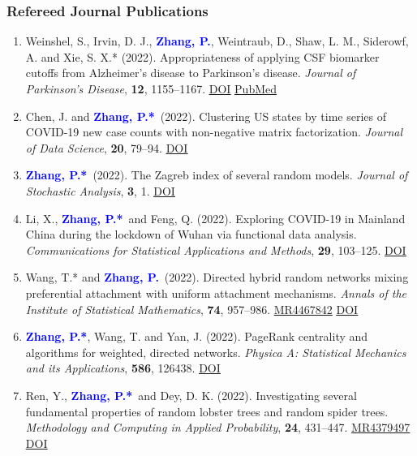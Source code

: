 \documentclass{res}
\def\MR#1{\href{http://www.ams.org/mathscinet-getitem?mr=#1}{MR#1}}
\newcommand{\PZ}{\textbf{\textcolor{blue}{Zhang, P.*}}}
\newcommand{\PZnot}{\textbf{\textcolor{blue}{Zhang, P.}}}
\begin{document}
\begin{resume}
\subsubsection{Refereed Journal Publications}
\begin{enumerate}
	\item {\sc Weinshel, S., Irvin, D. J.,} \PZnot, {\sc Weintraub, 
	D., Shaw, L. M., Siderowf, A. and Xie, S. X.*} (2022). 
	Appropriateness of applying CSF biomarker cutoffs from 
	Alzheimer’s disease to Parkinson’s disease. {\em Journal of 
	Parkinson's Disease}, {\bf 12}, 1155--1167. 
	\href{https://doi.org/10.3233/JPD-212989}{\underline{DOI}} 
	\href{https://pubmed.ncbi.nlm.nih.gov/35431261}
	{\underline{PubMed}}
	
	\item {\sc Chen, J.} and \PZ\ (2022). Clustering US states by 
	time series of COVID-19 new case counts with non-negative matrix 
	factorization. {\em Journal of Data Science}, {\bf 20}, 79--94.
	\href{https://doi.org/10.6339/22-JDS1036}{\underline{DOI}}
	
	\item \PZ\ (2022). The Zagreb index of several random models. 
	{\em Journal of Stochastic Analysis}, {\bf 3}, 1. 
	\href{https://doi.org/10.31390/josa.3.1.01}{\underline{DOI}}
	
	\item {\sc Li, X.}, \PZ\ and {\sc Feng, Q.} (2022). Exploring 
	COVID-19 in Mainland China during the lockdown of Wuhan via 
	functional data analysis. {\em Communications for Statistical 
	Applications and Methods}, {\bf 29}, 103--125. 
	\href{https://doi.org/10.29220/CSAM.2022.29.1.103}
	{\underline{DOI}}
	
	\item {\sc Wang, T.*} and \PZnot\ (2022). Directed 
	hybrid random networks mixing preferential attachment with 
	uniform attachment mechanisms. {\em Annals of the Institute of 
	Statistical Mathematics}, {\bf 74}, 957--986. \MR{4467842}
	\href{https://doi.org/10.1007/s10463-022-00827-5}
	{\underline{DOI}}
	
	\item \PZ, {\sc Wang, T.} and {\sc Yan, J.} (2022). PageRank 
	centrality and algorithms for weighted, directed networks. {\em 
	Physica A: Statistical Mechanics and its Applications}, {\bf 
	586}, 126438. 
	\href{https://doi.org/10.1016/j.physa.2021.126438}
	{\underline{DOI}}
	
	\item {\sc Ren, Y.}, \PZ\ and {\sc Dey, D. K.} (2022). 
	Investigating several fundamental properties of random 
	lobster trees and random spider trees. {\em Methodology and 
		Computing in Applied Probability}, {\bf 24}, 431--447. 
	\MR{4379497} \href{https://doi.org/10.1007/s11009-021-09863-9}
	{\underline{DOI}}
	

\end{enumerate}
\end{resume}
\end{document}
